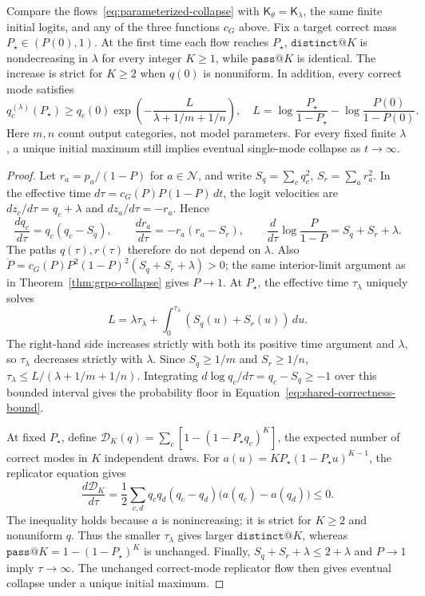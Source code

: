 \begin{theorem}
\label{thm:shared-correctness}
Compare the flows~\eqref{eq:parameterized-collapse} with
$\mathsf K_\theta=\mathsf K_\lambda$, the same finite initial logits, and any
of the three functions $c_G$ above. Fix a target correct mass
$P_\star\in(P(0),1)$. At the first time each flow reaches $P_\star$,
$\texttt{distinct@}K$ is nondecreasing in $\lambda$ for every integer $K\ge1$,
while $\texttt{pass@}K$ is identical. The increase is strict for $K\ge2$ when
$q(0)$ is nonuniform. In addition, every correct mode satisfies
\begin{equation}
 q_c^{(\lambda)}(P_\star)
 \ge q_c(0)\exp\!\left(-\frac{L}{\lambda+1/m+1/n}\right),
 \quad
 L=\log\frac{P_\star}{1-P_\star}-\log\frac{P(0)}{1-P(0)}.
 \label{eq:shared-correctness-bound}
\end{equation}
Here $m,n$ count output categories, not model parameters. For every fixed
finite $\lambda$, a unique initial maximum still implies eventual
single-mode collapse as $t\to\infty$.
\end{theorem}

\begin{proof}
Let $r_a=p_a/(1-P)$ for $a\in\mathcal N$, and write
$S_q=\sum_cq_c^2$, $S_r=\sum_ar_a^2$. In the effective time
$d\tau=c_G(P)P(1-P)\,dt$, the logit velocities are
$dz_c/d\tau=q_c+\lambda$ and $dz_a/d\tau=-r_a$. Hence
\begin{equation}
 \frac{dq_c}{d\tau}=q_c(q_c-S_q),\qquad
 \frac{dr_a}{d\tau}=-r_a(r_a-S_r),\qquad
 \frac{d}{d\tau}\log\frac{P}{1-P}=S_q+S_r+\lambda.
 \label{eq:shared-correctness-clock}
\end{equation}
The paths $q(\tau),r(\tau)$ therefore do not depend on $\lambda$.
Also $\dot P=c_G(P)P^2(1-P)^2(S_q+S_r+\lambda)>0$; the same interior-limit
argument as in Theorem~\ref{thm:grpo-collapse} gives $P\to1$.
At $P_\star$, the effective time $\tau_\lambda$ uniquely solves
\[
 L=\lambda\tau_\lambda+
   \int_0^{\tau_\lambda}(S_q(u)+S_r(u))\,du.
\]
The right-hand side increases strictly with both its positive time argument
and $\lambda$, so $\tau_\lambda$ decreases strictly with $\lambda$.
Since $S_q\ge1/m$ and $S_r\ge1/n$,
$\tau_\lambda\le L/(\lambda+1/m+1/n)$. Integrating
$d\log q_c/d\tau=q_c-S_q\ge-1$ over this bounded interval gives the probability
floor in Equation~\eqref{eq:shared-correctness-bound}.

At fixed $P_\star$, define
$\mathcal D_K(q)=\sum_c[1-(1-P_\star q_c)^K]$, the expected number of correct modes in
$K$ independent draws. For
$a(u)=KP_\star(1-P_\star u)^{K-1}$, the replicator equation gives
\[
 \frac{d\mathcal D_K}{d\tau}
 =\frac12\sum_{c,d}q_cq_d(q_c-q_d)\bigl(a(q_c)-a(q_d)\bigr)\le0.
\]
The inequality holds because $a$ is nonincreasing; it is strict for $K\ge2$
and nonuniform $q$. Thus the smaller $\tau_\lambda$ gives larger
$\texttt{distinct@}K$, whereas
$\texttt{pass@}K=1-(1-P_\star)^K$ is unchanged. Finally,
$S_q+S_r+\lambda\le2+\lambda$ and $P\to1$ imply $\tau\to\infty$.
The unchanged correct-mode replicator flow then gives eventual collapse
under a unique initial maximum.
\end{proof}

